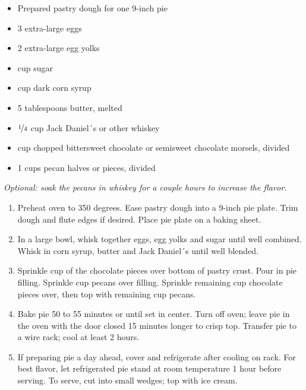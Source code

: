 \fromMom

\ingredients
\begin{itemize}
		\item Prepared pastry dough for one 9-inch pie
		\item 3 extra-large eggs
		\item 2 extra-large egg yolks
		\item {} cup sugar
		\item {} cup dark corn syrup
		\item 5 tablespoons butter, melted
		\item $\nicefrac{1}{4}$ cup Jack Daniel´s or other whiskey
		\item {} cup chopped bittersweet chocolate or semisweet chocolate morsels, divided
		\item 1 cups pecan halves or pieces, divided
\end{itemize}

\instructions
\textit{Optional: soak the pecans in whiskey for a couple hours to increase the
flavor.}
\begin{enumerate}
		\item Preheat oven to 350 degrees. Ease pastry dough into a 9-inch pie
				plate. Trim dough and flute edges if desired. Place pie plate
				on a baking sheet.
		\item In a large bowl, whisk together eggs, egg yolks and sugar until
				well combined. Whisk in corn syrup, butter and Jack Daniel´s
				until well blended.
		\item Sprinkle  cup of the chocolate pieces over bottom
				of pastry crust. Pour in pie filling. Sprinkle 
				cup pecans over filling. Sprinkle remaining  cup
				chocolate pieces over, then top with remaining 
				cup pecans.
		\item Bake pie 50 to 55 minutes or until set in center. Turn off oven;
				leave pie in the oven with the door closed 15 minutes longer to
				crisp top. Transfer pie to a wire rack; cool at least 2 hours.
		\item If preparing pie a day ahead, cover and refrigerate after cooling
				on rack. For best flavor, let refrigerated pie stand at room
				temperature 1 hour before serving. To serve, cut into small
				wedges; top with ice cream. 
\end{enumerate}

